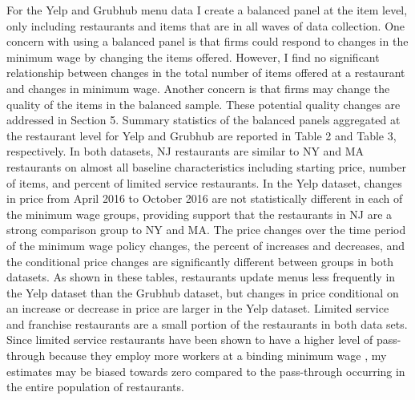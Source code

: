 \documentclass[11pt]{article}
\begin{document}
For the Yelp and Grubhub menu data I create a balanced panel at the item level, only including restaurants and items that are in all waves of data collection. One concern with using a balanced panel is that firms could respond to changes in the minimum wage by changing the items offered. However, I find no significant relationship between changes in the total number of items offered at a restaurant and changes in minimum wage. Another concern is that firms may change the quality of the items in the balanced sample. These potential quality changes are addressed in Section 5. Summary statistics of the balanced panels aggregated at the restaurant level for Yelp and Grubhub are reported in Table 2 and Table 3, respectively. In both datasets, NJ restaurants are similar to NY and MA restaurants on almost all baseline characteristics including starting price, number of items, and percent of limited service restaurants. In the Yelp dataset, changes in price from April 2016 to October 2016 are not statistically different in each of the minimum wage groups, providing support that the restaurants in NJ are a strong comparison group to NY and MA. The price changes over the time period of the minimum wage policy changes, the percent of increases and decreases, and the conditional price changes are significantly different between groups in both datasets. As shown in these tables, restaurants update menus less frequently in the Yelp dataset than the Grubhub dataset, but changes in price conditional on an increase or decrease in price are larger in the Yelp dataset. Limited service and franchise restaurants are a small portion of the restaurants in both data sets. 
Since limited service restaurants have been shown to have a higher level of pass-through because they employ more workers at a binding minimum wage \cite{aaronson2008minimum,allegretto2015local}, my estimates may be biased towards zero compared to the pass-through occurring in the entire population of restaurants.
\end{document}
